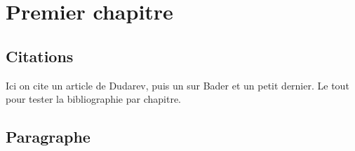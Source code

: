 \chapter{Premier chapitre}

\minitoc

\section{Citations}

Ici on cite un article de Dudarev\cite{Dudarev1998}, puis un sur Bader\cite{Henkelman2006}
et un petit dernier\cite{Blochl1994}. Le tout pour tester la bibliographie par chapitre.

\lipsum[6-8]

\section{Paragraphe}

\lipsum[9-12]

